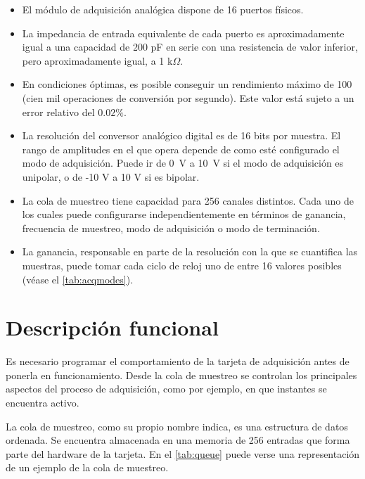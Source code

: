 \begin{itemize}
    \item El módulo de adquisición analógica dispone de 16 puertos físicos.
    \item La impedancia de entrada equivalente de cada puerto es
	aproximadamente igual a una capacidad de 200 pF en serie con una
	resistencia de valor inferior, pero aproximadamente igual, a 1
	k$\Omega$.
    \item En condiciones óptimas, es posible conseguir un rendimiento
	máximo de 100 \kms{} (cien mil operaciones de conversión por
	segundo). Este valor está sujeto a un error relativo del $0.02\%$.
    \item La resolución del conversor analógico digital es de 16 bits por
	muestra. El rango de amplitudes en el que opera depende de como
	esté configurado el modo de adquisición. Puede ir de \mbox{0 V} a
	\mbox{10 V} si el modo de adquisición es unipolar, o de -10 V a 10
	V si es bipolar.
    \item La cola de muestreo tiene capacidad para 256 canales distintos.
	Cada uno de los cuales puede configurarse independientemente en
	términos de ganancia, frecuencia de muestreo, modo de adquisición o
	modo de terminación.
    \item La ganancia, responsable en parte de la resolución con la que se
	cuantifica las muestras, puede tomar cada ciclo de reloj uno de
	entre 16 valores posibles (véase el \vref{tab:acqmodes}).
\end{itemize}


\section{Descripción funcional}\label{sec:funcdesc}

Es necesario programar el comportamiento de la tarjeta de adquisición antes
de ponerla en funcionamiento. Desde la cola de muestreo se controlan los
principales aspectos del proceso de adquisición, como por ejemplo, en que
instantes se encuentra activo.

La cola de muestreo, como su propio nombre indica, es una estructura de
datos ordenada. Se encuentra almacenada en una memoria  de 256
entradas que forma parte del hardware de la tarjeta. En el \cref{tab:queue}
puede verse una representación de un ejemplo de la cola de muestreo.

